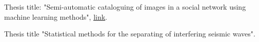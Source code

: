 
Thesis title: "Semi-automatic cataloguing of images in a social network using machine learning methods",
\href{https://github.com/AlekseySh/master_work}{\underline{link}}.

\divider

Thesis title "Statistical methods for the separating of interfering seismic waves".
